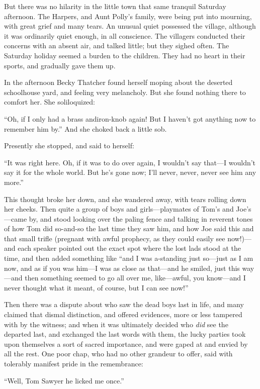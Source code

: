 \documentclass{book}
\begin{document}
But there was no hilarity in the little town that same tranquil Saturday afternoon. The Harpers, and Aunt Polly’s family, were being put into mourning, with great grief and many tears. An unusual quiet possessed the village, although it was ordinarily quiet enough, in all conscience. The villagers conducted their concerns with an absent air, and talked little; but they sighed often. The Saturday holiday seemed a burden to the children. They had no heart in their sports, and gradually gave them up.

In the afternoon Becky Thatcher found herself moping about the deserted schoolhouse yard, and feeling very melancholy. But she found nothing there to comfort her. She soliloquized:

“Oh, if I only had a brass andiron-knob again! But I haven’t got anything now to remember him by.” And she choked back a little sob.

Presently she stopped, and said to herself:

“It was right here. Oh, if it was to do over again, I wouldn’t say that—I wouldn’t say it for the whole world. But he’s gone now; I’ll never, never, never see him any more.”

This thought broke her down, and she wandered away, with tears rolling down her cheeks. Then quite a group of boys and girls—playmates of Tom’s and Joe’s—came by, and stood looking over the paling fence and talking in reverent tones of how Tom did so-and-so the last time they saw him, and how Joe said this and that small trifle (pregnant with awful prophecy, as they could easily see now!)—and each speaker pointed out the exact spot where the lost lads stood at the time, and then added something like “and I was a-standing just so—just as I am now, and as if you was him—I was as close as that—and he smiled, just this way—and then something seemed to go all over me, like—awful, you know—and I never thought what it meant, of course, but I can see now!”

Then there was a dispute about who saw the dead boys last in life, and many claimed that dismal distinction, and offered evidences, more or less tampered with by the witness; and when it was ultimately decided who \emph{did} see the departed last, and exchanged the last words with them, the lucky parties took upon themselves a sort of sacred importance, and were gaped at and envied by all the rest. One poor chap, who had no other grandeur to offer, said with tolerably manifest pride in the remembrance:

“Well, Tom Sawyer he licked me once.”
\end{document}
